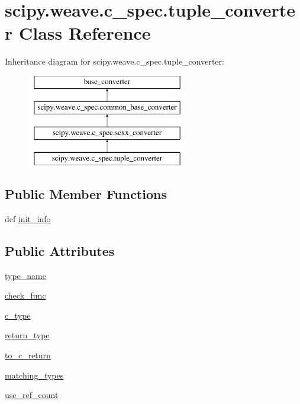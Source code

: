 \hypertarget{classscipy_1_1weave_1_1c__spec_1_1tuple__converter}{}\section{scipy.\+weave.\+c\+\_\+spec.\+tuple\+\_\+converter Class Reference}
\label{classscipy_1_1weave_1_1c__spec_1_1tuple__converter}
Inheritance diagram for scipy.\+weave.\+c\+\_\+spec.\+tuple\+\_\+converter\+:\begin{figure}[H]
\begin{center}
\leavevmode
\includegraphics[height=4.000000cm]{classscipy_1_1weave_1_1c__spec_1_1tuple__converter}
\end{center}
\end{figure}
\subsection*{Public Member Functions}
\begin{DoxyCompactItemize}
\item 
def \hyperlink{classscipy_1_1weave_1_1c__spec_1_1tuple__converter_a3f97cbb538415852bb1a329422e260bc}{init\+\_\+info}
\end{DoxyCompactItemize}
\subsection*{Public Attributes}
\begin{DoxyCompactItemize}
\item 
\hyperlink{classscipy_1_1weave_1_1c__spec_1_1tuple__converter_ad01ea52119293ec2e080eb52e9196ac3}{type\+\_\+name}
\item 
\hyperlink{classscipy_1_1weave_1_1c__spec_1_1tuple__converter_a930ba8b07727fc7961c508eb3323eff6}{check\+\_\+func}
\item 
\hyperlink{classscipy_1_1weave_1_1c__spec_1_1tuple__converter_a9eb178c8128dd4d999827a525973aa50}{c\+\_\+type}
\item 
\hyperlink{classscipy_1_1weave_1_1c__spec_1_1tuple__converter_a43a3d1d7f9b5726b5d36b338e1a6edb6}{return\+\_\+type}
\item 
\hyperlink{classscipy_1_1weave_1_1c__spec_1_1tuple__converter_a12ac82ef6cc71465fcf2b270bfec0e11}{to\+\_\+c\+\_\+return}
\item 
\hyperlink{classscipy_1_1weave_1_1c__spec_1_1tuple__converter_aabb0f306b52eadc50def2d7bdda95221}{matching\+\_\+types}
\item 
\hyperlink{classscipy_1_1weave_1_1c__spec_1_1tuple__converter_a1eec3478286495943e2fb0872547520a}{use\+\_\+ref\+\_\+count}
\end{DoxyCompactItemize}


